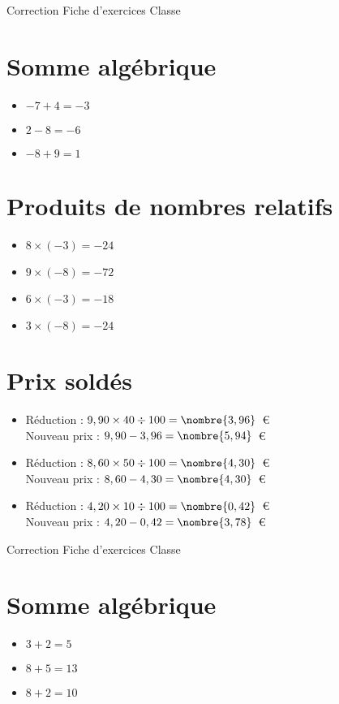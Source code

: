 \documentclass[a4paper,11pt,fleqn]{article}		%
\begin{document}
{Correction} \hfill {\huge Fiche d'exercices } \hfill {Classe}

\section{Somme algébrique}
\begin{itemize}

  \item $-7 +4=-3$
  \item $2 -8=-6$
  \item $-8 +9=1$
\end{itemize}

\section{Produits de nombres relatifs}
\begin{itemize}

  \item $8\times(-3)=-24$
  \item $9\times(-8)=-72$
  \item $6\times(-3)=-18$
  \item $3\times(-8)=-24$
\end{itemize}

\section{Prix soldés}
\begin{itemize}

  \item Réduction : $9,90\times40\div100=\nombre{3,96}$~€\\
  Nouveau prix : $9,90-3,96=\nombre{5,94}$~€
  \item Réduction : $8,60\times50\div100=\nombre{4,30}$~€\\
  Nouveau prix : $8,60-4,30=\nombre{4,30}$~€
  \item Réduction : $4,20\times10\div100=\nombre{0,42}$~€\\
  Nouveau prix : $4,20-0,42=\nombre{3,78}$~€
\end{itemize}
\newpage
\setcounter{exo}{0}
\setcounter{section}{0}
{Correction} \hfill {\huge Fiche d'exercices } \hfill {Classe}

\section{Somme algébrique}
\begin{itemize}

  \item $3 +2=5$
  \item $8 +5=13$
  \item $8 +2=10$
\end{itemize}
\end{document}
